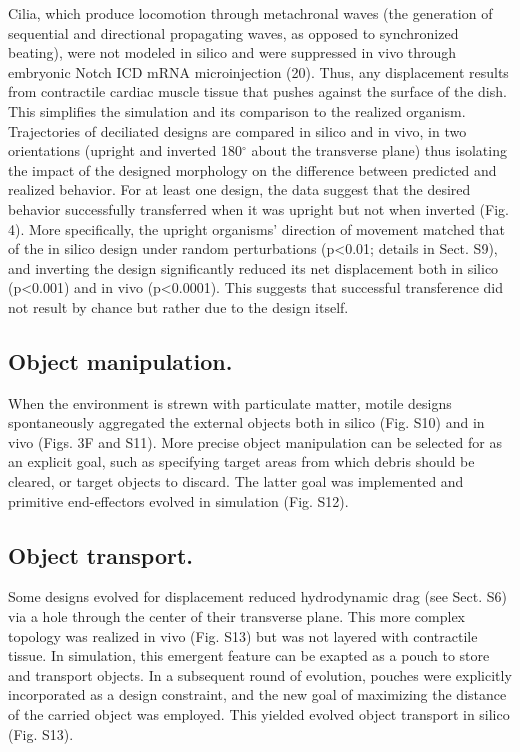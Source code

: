 Cilia, which produce locomotion through metachronal waves (the generation of sequential and directional propagating waves, as opposed to synchronized beating), were not modeled in silico and were suppressed in vivo through embryonic Notch ICD mRNA microinjection (20). Thus, any displacement results from contractile cardiac muscle tissue that pushes against the surface of the dish. This simplifies the simulation and its comparison to the realized organism. Trajectories of deciliated designs are compared in silico and in vivo, in two orientations (upright and inverted 180{$^{\circ}$} about the transverse plane) thus isolating the impact of the designed morphology on the difference between predicted and realized behavior. For at least one design, the data suggest that the desired behavior successfully transferred when it was upright but not when inverted (Fig. 4). More specifically, the upright organisms' direction of movement matched that of the in silico design under random perturbations (p<0.01; details in Sect. S9), and inverting the design significantly reduced its net displacement both in silico (p<0.001) and in vivo (p<0.0001). This suggests that successful transference did not result by chance but rather due to the design itself. 

\subsection*{Object manipulation.}  

When the environment is strewn with particulate matter, motile designs spontaneously aggregated the external objects both in silico (Fig. S10) and in vivo (Figs. 3F and S11). More precise object manipulation can be selected for as an explicit goal, such as specifying target areas from which debris should be cleared, or target objects to discard. The latter goal was implemented and primitive end-effectors evolved in simulation (Fig. S12).

\subsection*{Object transport.} 

Some designs evolved for displacement reduced hydrodynamic drag (see Sect. S6) via a hole through the center of their transverse plane. This more complex topology was realized in vivo (Fig. S13) but was not layered with contractile tissue. In simulation, this emergent feature can be exapted as a pouch to store and transport objects. In a subsequent round of evolution, pouches were explicitly incorporated as a design constraint, and the new goal of maximizing the distance of the carried object was employed. This yielded evolved object transport in silico (Fig. S13).

